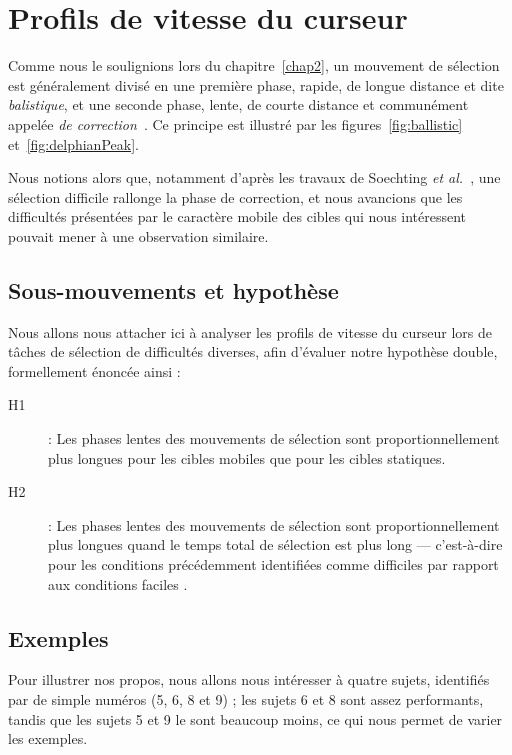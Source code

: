 \section{Profils de vitesse du curseur}
	Comme nous le soulignions lors du chapitre~\ref{chap2}, un mouvement de sélection est généralement divisé en une première phase, rapide, de longue distance et dite \emph{balistique}, et une seconde phase, lente, de courte distance et communément appelée \emph{de correction}~\cite{mackenzie1987three, crossman1983feedback}. Ce principe est illustré par les figures~\ref{fig:ballistic} et~\ref{fig:delphianPeak}.
	
	Nous notions alors que, notamment d'après les travaux de Soechting \emph{et al.}~\cite{soechting1984effect}, une sélection difficile rallonge la phase de correction, et nous avancions que les difficultés présentées par le caractère mobile des cibles qui nous intéressent pouvait mener à une observation similaire.
	
	\subsection{Sous-mouvements et hypothèse}
	Nous allons nous attacher ici à analyser les profils de vitesse du curseur lors de tâches de sélection de difficultés diverses, afin d'évaluer notre hypothèse double, formellement énoncée ainsi :
	
	\begin{description}
		\item[H1] : Les phases lentes des mouvements de sélection sont proportionnellement plus longues pour les cibles mobiles que pour les cibles statiques.
		\item[H2] : Les phases lentes des mouvements de sélection sont proportionnellement plus longues quand le temps total de sélection est plus long --- c'est-à-dire pour les conditions précédemment identifiées comme \og difficiles \fg{} par rapport aux conditions \og faciles \fg{}.
	\end{description}
	
	\subsection{Exemples}
	Pour illustrer nos propos, nous allons nous intéresser à quatre sujets, identifiés par de simple numéros (5, 6, 8 et 9) ; les sujets 6 et 8 sont assez performants, tandis que les sujets 5 et 9 le sont beaucoup moins, ce qui nous permet de varier les exemples.
	
